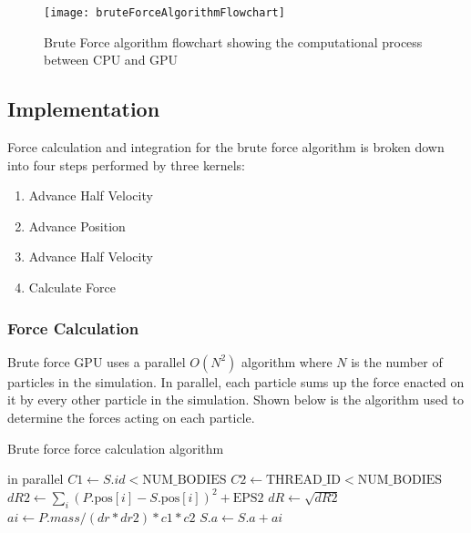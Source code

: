 \documentclass{thesis}
\begin{document}
\begin{figure}[h]
    \caption{Brute Force algorithm flowchart showing the computational process between CPU and GPU}
    \label{fig:GPUBruteForceAlg}
    \centering
    \texttt{[image: bruteForceAlgorithmFlowchart]}
\end{figure}

\subsection{Implementation}
Force calculation and integration for the brute force algorithm is broken down into four steps performed by three kernels:
\begin{enumerate}[noitemsep]
    \item Advance Half Velocity
    \item Advance Position
    \item Advance Half Velocity
    \item Calculate Force
\end{enumerate}
\subsubsection{Force Calculation}
Brute force GPU uses a parallel $O(N^2)$ algorithm where $N$ is the number of particles in the simulation. In parallel, each particle sums up the force enacted on it by every other particle in the simulation. Shown below is the algorithm used to determine the forces acting on each particle.
\begin{algorithm}
    \label{alg:ForceCalculationExact}
    \caption{Brute force force calculation algorithm}
    \begin{algorithmic}
         in parallel
                \State $C1 \gets S.id < \text{NUM\_BODIES}$
                \State $C2 \gets \text{THREAD\_ID} < \text{NUM\_BODIES}$
                \State $dR2 \gets \sum_i (P.\text{pos}[i] - S.\text{pos}[i])^2 + \text{EPS2}$
                \State $dR \gets \sqrt{dR2}$
                \State $ai \gets P.mass/(dr*dr2) * c1 * c2$
                \State $S.a \gets S.a + ai$ 
            \EndFor
        \EndFor
    \end{algorithmic}
\end{algorithm}
\end{document}
